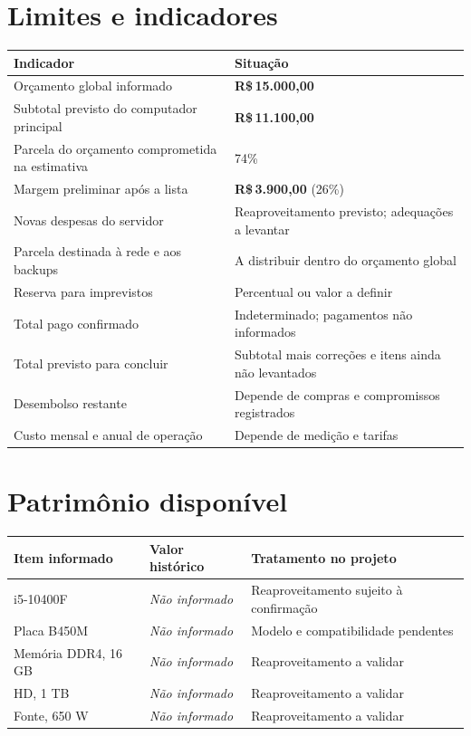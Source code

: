 \documentclass[11pt,a4paper,oneside]{report}
\newcommand{\naoinformado}{\textit{Não informado}}
\newcommand{\dinheiro}[1]{R\$\,#1}
\begin{document}
\section{Limites e indicadores}
\begin{tabularx}{\textwidth}{@{}p{6.2cm}Y@{}}
\toprule
Indicador & Situação \\
\midrule
Orçamento global informado & \textbf{\dinheiro{15.000,00}} \\
Subtotal previsto do computador principal & \textbf{\dinheiro{11.100,00}} \\
Parcela do orçamento comprometida na estimativa & 74\% \\
Margem preliminar após a lista & \textbf{\dinheiro{3.900,00}} (26\%) \\
Novas despesas do servidor & Reaproveitamento previsto; adequações a levantar \\
Parcela destinada à rede e aos backups & A distribuir dentro do orçamento global \\
Reserva para imprevistos & Percentual ou valor a definir \\
Total pago confirmado & Indeterminado; pagamentos não informados \\
Total previsto para concluir & Subtotal mais correções e itens ainda não levantados \\
Desembolso restante & Depende de compras e compromissos registrados \\
Custo mensal e anual de operação & Depende de medição e tarifas \\
\bottomrule
\end{tabularx}

\section{Patrimônio disponível}
\begin{tabularx}{\textwidth}{@{}p{4.3cm}p{3cm}Y@{}}
\toprule
Item informado & Valor histórico & Tratamento no projeto \\
\midrule
i5-10400F & \naoinformado & Reaproveitamento sujeito à confirmação \\
Placa B450M & \naoinformado & Modelo e compatibilidade pendentes \\
Memória DDR4, 16 GB & \naoinformado & Reaproveitamento a validar \\
HD, 1 TB & \naoinformado & Reaproveitamento a validar \\
Fonte, 650 W & \naoinformado & Reaproveitamento a validar \\
\bottomrule
\end{tabularx}
\end{document}
